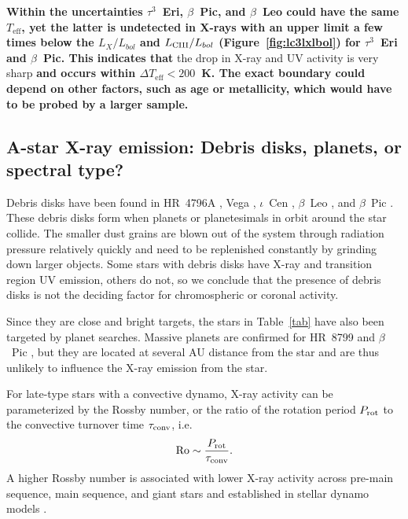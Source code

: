 \documentclass[linenumbers]{aastex631}
\begin{document}
 \textbf{Within the uncertainties $\tau^3$~Eri, $\beta$~Pic, and
$\beta$~Leo could have the same $T_\mathrm{eff}$, yet the latter is undetected in X-rays with an upper limit a few times below the $L_X/L_{bol}$ and  $L_\mathrm{C {\sc III}}/L_{bol}$ (Figure~\ref{fig:lc3lxlbol}) for $\tau^3$~Eri and $\beta$~Pic. This indicates that }
the drop in X-ray and UV activity is very sharp \textbf{and occurs within $\Delta T_\mathrm{eff}<200$~K. The exact boundary could depend on other factors, such as age or metallicity, which would have to be probed by a larger sample.}



\subsection{A-star  X-ray emission: Debris disks, planets, or spectral type?}
Debris disks have been found in 
HR~4796A \citep[e.g.][]{1991ApJ...383L..79J}, Vega
\citep[e.g.][]{2005ApJ...628..487S}, $\iota$~Cen
\citep[e.g.][]{2011ApJ...736L..32Q}, $\beta$~Leo  \citep[e.g.][]{2021AJ....161..186D}, and
$\beta$~Pic \citep[e.g.][]{2001MNRAS.323..402L}.  These debris disks
form when planets or planetesimals in orbit around the star
collide. The smaller dust grains are blown out of the system through
radiation pressure relatively quickly and need to be replenished
constantly by grinding down larger objects. 
Some stars with debris disks have X-ray and transition region UV emission, others do not, so we conclude that the presence of debris disks is not the deciding factor for chromospheric or coronal activity.

Since they are close and bright targets, the stars in Table~\ref{tab}
have also been targeted by planet searches. Massive planets are
confirmed for HR~8799 \citep{2008Sci...322.1348M} and $\beta$~Pic
\citep[e.g.][]{2021AJ....161..179B}, but they are located at several
AU distance from the star and are thus unlikely to influence the
X-ray emission from the star.

For late-type stars with a convective dynamo, X-ray activity can be parameterized by the Rossby number, or the ratio of the rotation period $P_{\rm rot}$ to the convective turnover time $\tau_{\rm conv}$, i.e.
\begin{equation}
{\rm Ro} \sim \frac{P_{\rm rot}}{\tau_{\rm conv}}. \label{eqn:ro}
\end{equation}
A higher Rossby number is associated with lower X-ray activity across pre-main sequence, main sequence, and giant stars \citep{Preibisch+2005, Pizzolato+2003, Gondoin+2005,2011ApJ...743...48W} and established in stellar dynamo models \citep[e.g.][]{Brandenburg+1998}.
\end{document}
